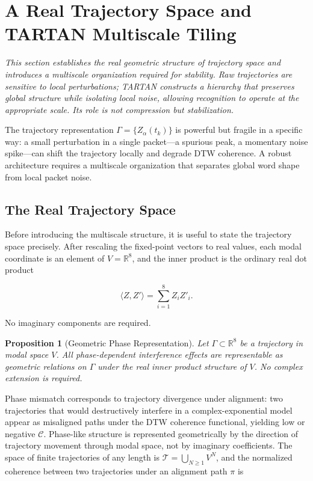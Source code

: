 \documentclass[12pt, a4paper]{article}
\newtheorem{proposition}{Proposition}
\begin{document}
\section{A Real Trajectory Space and TARTAN Multiscale Tiling}

\noindent\textit{This section establishes the real geometric structure of trajectory space and introduces a multiscale organization required for stability. Raw trajectories are sensitive to local perturbations; TARTAN constructs a hierarchy that preserves global structure while isolating local noise, allowing recognition to operate at the appropriate scale. Its role is not compression but stabilization.}


The trajectory representation $\Gamma = \{Z_\alpha(t_k)\}$ is powerful but fragile in a specific way: a small perturbation in a single packet---a spurious peak, a momentary noise spike---can shift the trajectory locally and degrade DTW coherence. A robust architecture requires a multiscale organization that separates global word shape from local packet noise.

\subsection{The Real Trajectory Space}

Before introducing the multiscale structure, it is useful to state the trajectory space precisely. After rescaling the fixed-point vectors to real values, each modal coordinate is an element of $V = \mathbb{R}^8$, and the inner product is the ordinary real dot product

\begin{equation}
\langle Z, Z' \rangle = \sum_{i=1}^{8} Z_i Z'_i.
\label{eq:ip}
\end{equation}

No imaginary components are required.

\begin{proposition}[Geometric Phase Representation]
Let $\Gamma \subset \mathbb{R}^8$ be a trajectory in modal space $V$. All phase-dependent interference effects are representable as geometric relations on $\Gamma$ under the real inner product structure of $V$. No complex extension is required.
\end{proposition}

Phase mismatch corresponds to trajectory divergence under alignment: two trajectories that would destructively interfere in a complex-exponential model appear as misaligned paths under the DTW coherence functional, yielding low or negative $\mathcal{C}$. Phase-like structure is represented geometrically by the direction of trajectory movement through modal space, not by imaginary coefficients. The space of finite trajectories of any length is $\mathcal{T} = \bigcup_{N \geq 1} V^N$, and the normalized coherence between two trajectories under an alignment path $\pi$ is
\end{document}
